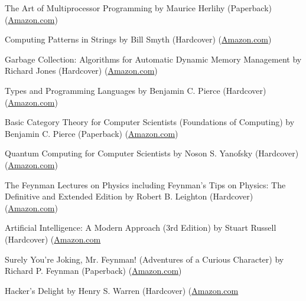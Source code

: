 \documentclass[10pt]{article}
\newenvironment{innerlist}[1][\enskip\textbullet]%
      {\begin{flushleft}\begin{compactitem}[#1]}{\end{compactitem}\end{flushleft}}
\begin{document}
\begin{innerlist}
                \item The Art of Multiprocessor Programming
                  by Maurice Herlihy (Paperback)
                  (\href{http://www.amazon.com/Art-Multiprocessor-Programming-Maurice-Herlihy/dp/0123705916}{Amazon.com})
                \item Computing Patterns in Strings
                  by Bill Smyth (Hardcover)
                  (\href{http://www.amazon.com/Computing-Patterns-Strings-William-Smyth/dp/0201398397}{Amazon.com})
                \item Garbage Collection: Algorithms for Automatic Dynamic Memory Management
                  by Richard Jones (Hardcover)
                  (\href{http://www.amazon.com/Garbage-Collection-Algorithms-Automatic-Management/dp/0471941484}{Amazon.com})

                \item Types and Programming Languages
                  by Benjamin C. Pierce (Hardcover)
                  (\href{http://www.amazon.com/Types-Programming-Languages-Benjamin-Pierce/dp/0262162091}{Amazon.com})
                \item Basic Category Theory for Computer Scientists (Foundations of Computing)
                  by Benjamin C. Pierce (Paperback)
                  (\href{http://www.amazon.com/Category-Computer-Scientists-Foundations-Computing/dp/0262660717}{Amazon.com})

		\item Quantum Computing for Computer Scientists
                  by Noson S. Yanofsky (Hardcover)
                  (\href{http://www.amazon.com/Quantum-Computing-Computer-Scientists-Yanofsky/dp/0521879965}{Amazon.com})
                \item The Feynman Lectures on Physics including Feynman's Tips on Physics: The Definitive and Extended Edition
                  by Robert B. Leighton (Hardcover)
                  (\href{http://www.amazon.com/Feynman-Lectures-Physics-including-Feynmans/dp/0805390456}{Amazon.com})

                \item Artificial Intelligence: A Modern Approach (3rd Edition)
                  by Stuart Russell (Hardcover)
                  (\href{http://www.amazon.com/Artificial-Intelligence-Modern-Approach-3rd/dp/0136042597}{Amazon.com}

                \item Surely You're Joking, Mr. Feynman! (Adventures of a Curious Character)
                  by Richard P. Feynman (Paperback)
                  (\href{http://www.amazon.com/Surely-Feynman-Adventures-Curious-Character/dp/0393316041}{Amazon.com})
                \item Hacker's Delight
                  by Henry S. Warren (Hardcover)
                  (\href{http://www.amazon.com/Hackers-Delight-Henry-S-Warren/dp/0201914654}{Amazon.com}
	\end{innerlist}
\end{document}
